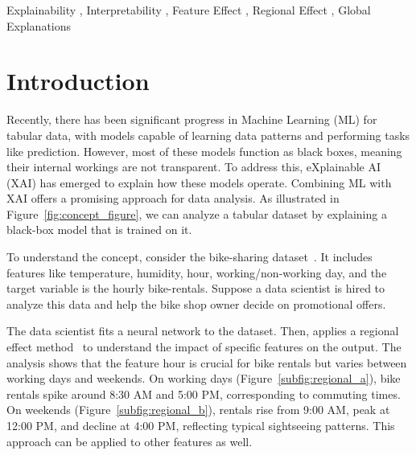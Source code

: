 \documentclass[
twocolumn,
]{ceurart}
\begin{document}
\begin{keywords}
  Explainability \sep
  Interpretability \sep
  Feature Effect \sep
  Regional Effect \sep
  Global Explanations
\end{keywords}

\maketitle


\section{Introduction}
\label{sec:introduction}

Recently, there has been significant progress in Machine Learning (ML) for tabular data, with models capable of learning data patterns and performing tasks like prediction. However, most of these models function as black boxes, meaning their internal workings are not transparent. To address this, eXplainable AI (XAI) has emerged to explain how these models operate. Combining ML with XAI offers a promising approach for data analysis. As illustrated in Figure~\ref{fig:concept_figure}, we can analyze a tabular dataset by explaining a black-box model that is trained on it.

To understand the concept, consider the bike-sharing dataset~\cite{fanaee2014event}. It includes features like temperature, humidity, hour, working/non-working day, and the target variable is the hourly bike-rentals. Suppose a data scientist is hired to analyze this data and help the bike shop owner decide on promotional offers.

The data scientist fits a neural network to the dataset. Then, applies a regional effect method~\cite{herbinger2023decomposing, herbinger_repid_2022} to understand the impact of specific features on the output. The analysis shows that the feature hour is crucial for bike rentals but varies between working days and weekends. On working days (Figure~\ref{subfig:regional_a}), bike rentals spike around 8:30 AM and 5:00 PM, corresponding to commuting times. On weekends (Figure~\ref{subfig:regional_b}), rentals rise from 9:00 AM, peak at 12:00 PM, and decline at 4:00 PM, reflecting typical sightseeing patterns. This approach can be applied to other features as well.
\end{document}
